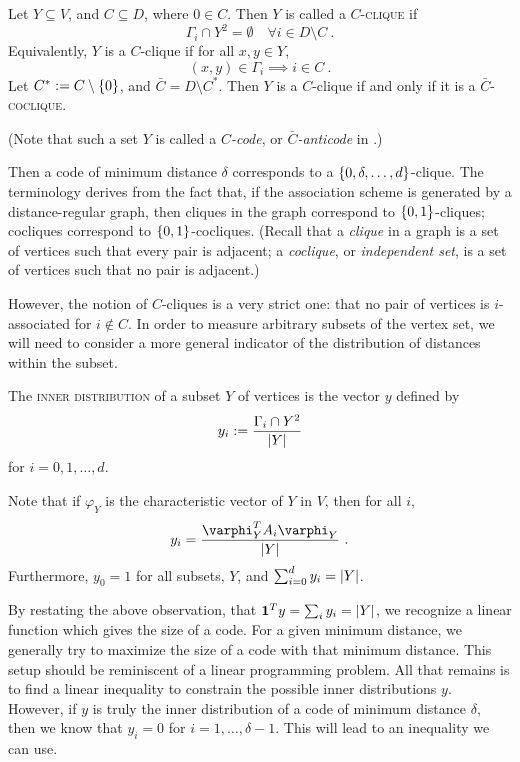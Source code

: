 \documentclass{report}
\newcommand{\vone}{\mathbf{1}}
\begin{document}
    \begin{defn}
      \label{defn:AS-clique}
      Let $Y \subseteq V$, and $C \subseteq D$, where $0 \in C$.
      Then $Y$ is called a \textsc{$C$-clique} if
      $$
        \Gamma_i \cap Y^2 = \emptyset \quad \forall i \in D \setminus C
        \ .
      $$
      Equivalently, $Y$ is a $C$-clique if for all $x, y \in Y$,
      $$
        (x, y) \in \Gamma_i \implies i \in C
        \ .
      $$
      Let $C^* := C \setminus \left\lbrace 0 \right\rbrace$, and $\bar{C} = D \setminus C^*$.
      Then $Y$ is a $C$-clique if and only if it is a
      \textsc{$\bar{C}$-coclique}.

      (Note that such a set $Y$ is called a \textit{$C$-code},
      or \textit{$\bar{C}$-anticode} in \cite{godsil}.)
    \end{defn}

    Then a code of minimum distance $\delta$ corresponds to a $\left\lbrace 0, \delta,
    \ldots, d \right\rbrace$-clique.  The terminology derives from the fact that, if the
    association scheme is generated by a distance-regular graph, then cliques in
    the graph correspond to $\left\lbrace 0, 1 \right\rbrace$-cliques; cocliques correspond to
    $\left\lbrace 0, 1 \right\rbrace$-cocliques.  (Recall that a \textit{clique} in a graph is a set
    of vertices such that every pair is adjacent; a \textit{coclique}, or
    \textit{independent set}, is a set of vertices such that no pair is
    adjacent.)

    However, the notion of $C$-cliques is a very strict one: that no pair of
    vertices is $i$-associated for $i \not\in C$.  In order to measure arbitrary
    subsets of the vertex set, we will need to consider a more general indicator
    of the distribution of distances within the subset.

    \begin{defn}\label{defn:inner-distribution}
      The \textsc{inner distribution} of a subset $Y$ of vertices is the vector
      $y$ defined by
      $$
        y_i := \frac{ \Gamma_i \cap Y^2 }{ \left\lvert Y \right\rvert }
      $$
      for $i = 0, 1, \ldots, d$.  
    \end{defn}

    Note that if $\varphi_Y$ is the characteristic vector of $Y$ in $V$, then
    for all $i$,
    $$
      y_i = \frac{ \varphi_Y^T A_i \varphi_Y }{ \abs{Y} } \ .
    $$
    Furthermore, $y_0 = 1$ for all subsets, $Y$, and $\sum_{i = 0}^d y_i =
    \left\lvert Y \right\rvert$.  

    By restating the above observation, that $\vone^T y = \sum_i y_i = \abs{Y}$,
    we recognize a linear function which gives the size of a code.  For a given
    minimum distance, we generally try to maximize the size of a code with that
    minimum distance.  This setup should be reminiscent of a linear programming
    problem.  All that remains is to find a linear inequality to constrain the
    possible inner distributions $y$.  However, if $y$ is truly the inner
    distribution of a code of minimum distance $\delta$, then we know that $y_i
    = 0$ for $i = 1, \ldots, \delta - 1$.  This will lead to an inequality we
    can use.
\end{document}
